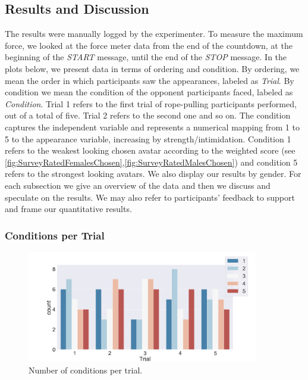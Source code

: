 \subsection{Results and Discussion}
The results were manually logged by the experimenter. To measure the maximum force, we looked at the force meter data from the end of the countdown, at the beginning of the \textit{START} message, until the end of the \textit{STOP} message. In the plots below, we present data in terms of ordering and condition. By ordering, we mean the order in which participants saw the appearances, labeled as \textit{Trial}. By condition we mean the condition of the opponent participants faced, labeled as \textit{Condition}. Trial 1 refers to the first trial of rope-pulling participants performed, out of a total of five. Trial 2 refers to the second one and so on. The condition captures the independent variable and represents a numerical mapping from 1 to 5 to the appearance variable, increasing by strength/intimidation. Condition 1 refers to the weakest looking chosen avatar according to the weighted score (see \ref{fig:SurveyRatedFemalesChosen},\ref{fig:SurveyRatedMalesChosen}) and condition 5 refers to the strongest looking avatars. We also display our results by gender. For each subsection we give an overview of the data and then we discuss and speculate on the results. We may also refer to participants' feedback to support and frame our quantitative results.
\subsubsection{Conditions per Trial}
\begin{figure}[H]
\vspace*{-3mm}
 \centering
 \captionsetup{justification=centering,margin=0.1cm}
\includegraphics[width=0.9\textwidth]{Files/Plots/condition_by_trial.png}
 \caption{Number of conditions per trial.}
 \label{fig:condPerTrial}
  \end{figure}

